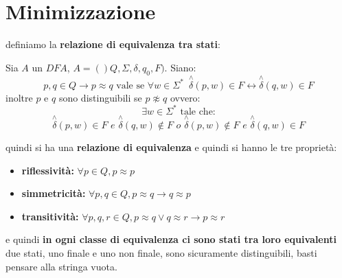 \documentclass[a4paper,12pt, oneside]{book}
\begin{document}
\section{Minimizzazione}
definiamo la \textbf{relazione di equivalenza tra stati}:
\begin{definizione}
	Sia $A$ un $DFA$, $A=()Q,\Sigma,\delta,q_0,F)$. Siano:
	$$p,q\in Q\to p\approx q\mbox{ vale se } \forall w \in \Sigma^*\,\,\, \stackrel{\wedge}{\delta}(p,w)\in F\longleftrightarrow \stackrel{\wedge}{\delta}(q,w)\in F$$
	inoltre $p$ e $q$ sono distinguibili se $p\not\approx q$ ovvero:
	$$\exists w\in \Sigma^*\mbox{ tale che:} $$
	$$\stackrel{\wedge}{\delta}(p,w)\in F \,\,e\,\,\stackrel{\wedge}{\delta}(q,w)\not\in F\,\,o\,\,\stackrel{\wedge}{\delta}(p,w)\not\in F \,\,e\,\,\stackrel{\wedge}{\delta}(q,w)\in F$$
\end{definizione}
quindi si ha una \textbf{relazione di equivalenza} e quindi si hanno le tre proprietà:
\begin{itemize}
	\item \textbf{riflessività:} $\forall p\in Q, p\approx p$
	\item \textbf{simmetricità:} $\forall p,q\in Q, p\approx q\to q\approx p$
	\item \textbf{transitività:} $\forall p,q,r\in Q, p\approx q\vee q\approx r\to p\approx r$
\end{itemize}
e quindi \textbf{in ogni classe di equivalenza ci sono stati tra loro equivalenti}
due stati, uno finale e uno non finale, sono sicuramente distinguibili, basti pensare alla stringa vuota.
\end{document}
